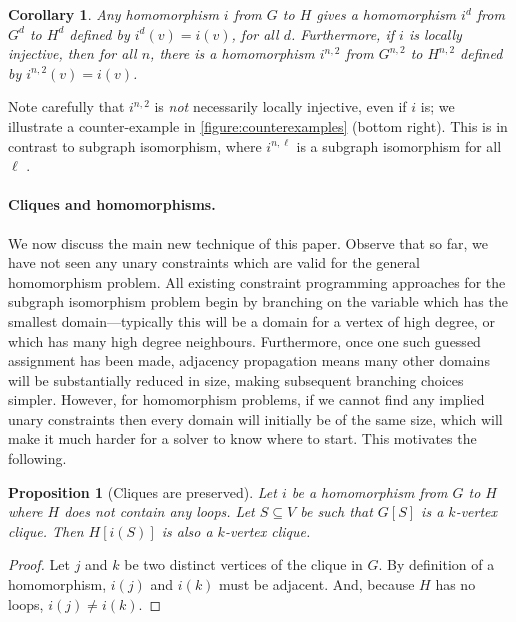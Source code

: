 \documentclass{article}
\newtheorem{proposition}{Proposition}
\newtheorem{corollary}{Corollary}
\begin{document}
\begin{corollary}Any homomorphism $i$ from $G$ to $H$ gives a homomorphism $i^d$ from $G^d$ to $H^d$
    defined by $i^d(v) = i(v)$, for all $d$. Furthermore, if $i$ is locally injective, then for all
    $n$, there is a homomorphism $i^{n,2}$ from $G^{n,2}$ to
    $H^{n,2}$ defined by $i^{n,2}(v) = i(v)$.\label{corollary:lishapes}
\end{corollary}

Note carefully that $i^{n,2}$ is \emph{not} necessarily locally injective, even if $i$ is; we
illustrate a counter-example in \cref{figure:counterexamples} (bottom right). This is in contrast to
subgraph isomorphism, where $i^{n,\ell}$ is a subgraph isomorphism for all $\ell$
\cite{DBLP:conf/cp/McCreeshP15}.

\paragraph{Cliques and homomorphisms.} We now discuss the main new technique of this paper. Observe
that so far, we have not seen any unary constraints which are valid for the general homomorphism
problem. All existing constraint programming approaches for the subgraph isomorphism problem begin
by branching on the variable which has the smallest domain---typically this will be a domain for a
vertex of high degree, or which has many high degree neighbours. Furthermore, once one such
guessed assignment has been made, adjacency propagation means many other domains will be
substantially reduced in size, making subsequent branching choices simpler.  However, for
homomorphism problems, if we cannot find any implied unary constraints then every domain will
initially be of the same size, which will make it much harder for a solver to know where to start.
This motivates the following.

\begin{proposition}[Cliques are preserved]\label{proposition:clique}
    Let $i$ be a homomorphism from $G$ to $H$ where $H$ does
    not contain any loops. Let $S\subseteq V$ be such that $G[S]$ is a $k$-vertex clique. Then
    $H[i(S)]$ is also a $k$-vertex clique.
\end{proposition}

\begin{proof}
    Let $j$ and $k$ be two distinct vertices of the clique in $G$. By definition of a homomorphism,
    $i(j)$ and $i(k)$ must be adjacent. And, because $H$ has no loops, $i(j) \ne i(k)$.
\end{proof}
\end{document}
